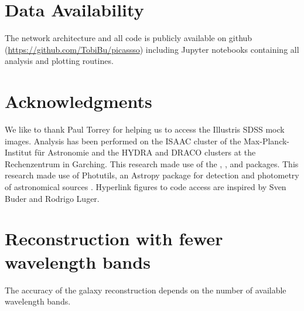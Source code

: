 \documentclass[useAMS,usenatbib]{mnras}
\begin{document}
\section*{Data Availability}
The network architecture and all code is publicly available on github (\url{https://github.com/TobiBu/picassso}) including Jupyter notebooks containing all analysis and plotting routines. %


\section*{Acknowledgments}
We like to thank Paul Torrey for helping us to access the Illustris SDSS mock images.
Analysis has been performed on the ISAAC cluster of the Max-Planck-Institut für Astronomie and the HYDRA and DRACO clusters at the Rechenzentrum in Garching.
This research made use of the {} \citep{matplotlib}, {} \citep{scipy}, {} \citep{astropy2018} and {} \citep{numpy,ipython,jupyter} {} packages.
This research made use of Photutils, an Astropy package for detection and photometry of astronomical sources \citep{Bradley2020}.
Hyperlink figures to code access are inspired by Sven Buder and Rodrigo Luger.



%


\appendix
\section{Reconstruction with fewer wavelength bands}
\label{sec:ap_bands}

The accuracy of the galaxy reconstruction depends on the number of available wavelength bands. 
\end{document}
